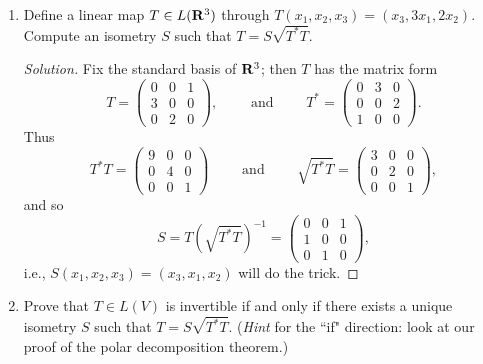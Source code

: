 \documentclass[11pt]{amsart}
\begin{document}
\begin{enumerate}[(1)]

\vspace{12pt}

\item Define a linear map $T \in L(\mathbf{R}^3)$ through $T(x_1, x_2, x_3) = (x_3, 3x_1, 2x_2)$. Compute an isometry $S$ such that $T = S \sqrt{ T^* T }$.

\begin{proof}[Solution]
Fix the standard basis of $\mathbf{R}^3$; then $T$ has the matrix form
\[
  T = \left(
  \begin{array}{ccc}
    0 & 0 & 1 \\
    3 & 0 & 0 \\
    0 & 2 & 0
  \end{array}
  \right) ,
  \qquad \text{ and } \qquad
  T^* = \left(
  \begin{array}{ccc}
    0 & 3 & 0 \\
    0 & 0 & 2 \\
    1 & 0 & 0
  \end{array}
  \right) .
\]
Thus
\[
  T^* T = \left(
  \begin{array}{ccc}
    9 & 0 & 0 \\
    0 & 4 & 0 \\
    0 & 0 & 1
  \end{array}
  \right)
  \qquad \text{ and } \qquad
  \sqrt{ T^* T } = \left(
  \begin{array}{ccc}
    3 & 0 & 0 \\
    0 & 2 & 0 \\
    0 & 0 & 1
  \end{array}
  \right) ,
\]
and so
\[
  S = T \left( \sqrt{ T^* T } \right)^{ -1 } = \left(
  \begin{array}{ccc}
    0 & 0 & 1 \\
    1 & 0 & 0 \\
    0 & 1 & 0
  \end{array}
  \right) ,
\]
i.e., $S(x_1, x_2, x_3) = (x_3, x_1, x_2)$ will do the trick.
\end{proof}

\item Prove that $T \in L(V)$ is invertible if and only if there exists a unique isometry $S$ such that $T = S \sqrt{ T^* T }$.
(\emph{Hint} for the ``if" direction: look at our proof of the polar decomposition theorem.)


\end{enumerate}
\end{document}
